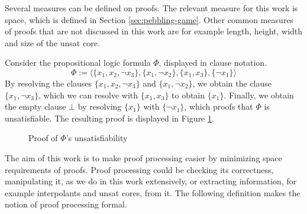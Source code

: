 Several measures can be defined on proofs.
The relevant measure for this work is space, which is defined in Section \ref{sec:pebbling-game}.
Other common measures of proofs that are not discussed in this work are for example length, height, width and size of the unsat core.


\begin{example}

Consider the propositional logic formula $\Phi$, displayed in clause notation.
$$\Phi := {\langle \{x_1, x_2, \neg x_3\}, \{x_1, \neg x_2\}, \{x_1, x_3\}, \{\neg x_1\} \rangle}$$
By resolving the clauses $\{x_1, x_2, \neg x_3\}$ and $\{x_1, \neg x_2\}$, we obtain the clause $\{x_1,\neg x_3\}$, which we can resolve with $\{x_1, x_3\}$ to obtain $\{x_1\}$.
Finally, we obtain the empty clause $\bot$ by resolving $\{x_1\}$ with $\{\neg x_1\}$,
which proofs that $\Phi$ is unsatisfiable.
The resulting proof is displayed in Figure \ref{fig:resolutionexample}.

\begin{figure}[!h]


\caption{Proof of $\Phi$'s unsatisfiability}
\label{fig:resolutionexample}
\end{figure}


%

\end{example}

The aim of this work is to make proof processing easier by minimizing space requirements of proofs.
Proof processing could be checking its correctness, manipulating it, as we do in this work extensively, or extracting information, for example interpolants and unsat cores, from it.
The following definition makes the notion of proof processing formal.

